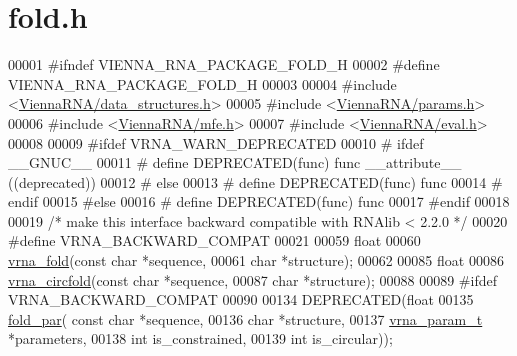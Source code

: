 \hypertarget{fold_8h_source}{}\section{fold.\+h}
\label{fold_8h_source}

\begin{DoxyCode}
00001 \textcolor{preprocessor}{#ifndef VIENNA\_RNA\_PACKAGE\_FOLD\_H}
00002 \textcolor{preprocessor}{#define VIENNA\_RNA\_PACKAGE\_FOLD\_H}
00003 
00004 \textcolor{preprocessor}{#include <\hyperlink{data__structures_8h}{ViennaRNA/data\_structures.h}>}
00005 \textcolor{preprocessor}{#include <\hyperlink{params_8h}{ViennaRNA/params.h}>}
00006 \textcolor{preprocessor}{#include <\hyperlink{mfe_8h}{ViennaRNA/mfe.h}>}
00007 \textcolor{preprocessor}{#include <\hyperlink{eval_8h}{ViennaRNA/eval.h}>}
00008 
00009 \textcolor{preprocessor}{#ifdef VRNA\_WARN\_DEPRECATED}
00010 \textcolor{preprocessor}{# ifdef \_\_GNUC\_\_}
00011 \textcolor{preprocessor}{#  define DEPRECATED(func) func \_\_attribute\_\_ ((deprecated))}
00012 \textcolor{preprocessor}{# else}
00013 \textcolor{preprocessor}{#  define DEPRECATED(func) func}
00014 \textcolor{preprocessor}{# endif}
00015 \textcolor{preprocessor}{#else}
00016 \textcolor{preprocessor}{# define DEPRECATED(func) func}
00017 \textcolor{preprocessor}{#endif}
00018 
00019 \textcolor{comment}{/* make this interface backward compatible with RNAlib < 2.2.0 */}
00020 \textcolor{preprocessor}{#define VRNA\_BACKWARD\_COMPAT}
00021 
00059 \textcolor{keywordtype}{float}
00060 \hyperlink{group__mfe__fold__single_ga29a33b2895f4e67b0480271ff289afdc}{vrna\_fold}(\textcolor{keyword}{const} \textcolor{keywordtype}{char} *sequence,
00061           \textcolor{keywordtype}{char} *structure);
00062 
00085 \textcolor{keywordtype}{float}
00086 \hyperlink{group__mfe__fold__single_gaf973483d8acbc8cc9aacfc8a9b7f0074}{vrna\_circfold}(\textcolor{keyword}{const} \textcolor{keywordtype}{char} *sequence,
00087               \textcolor{keywordtype}{char} *structure);
00088 
00089 \textcolor{preprocessor}{#ifdef  VRNA\_BACKWARD\_COMPAT}
00090 
00134 DEPRECATED(\textcolor{keywordtype}{float}
00135 \hyperlink{group__mfe__fold__single_ga2bc41df5d71fee6fd8da9904ee65d8fb}{fold\_par}( \textcolor{keyword}{const} \textcolor{keywordtype}{char} *sequence,
00136           \textcolor{keywordtype}{char} *structure,
00137           \hyperlink{group__energy__parameters_structvrna__param__s}{vrna\_param\_t} *parameters,
00138           \textcolor{keywordtype}{int} is\_constrained,
00139           \textcolor{keywordtype}{int} is\_circular));

\end{DoxyCode}
